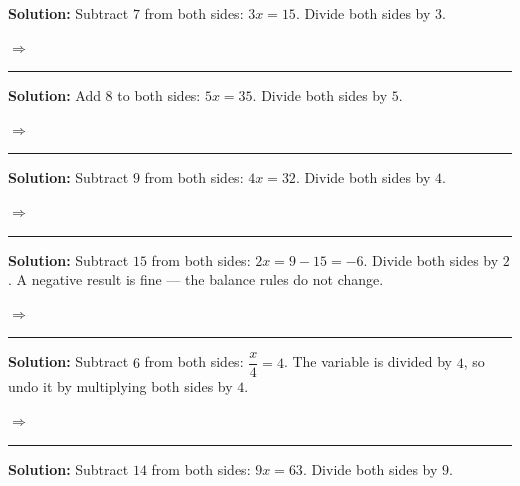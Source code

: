 \documentclass[12pt]{article}
\begin{document}




\textbf{Solution:} Subtract $7$ from both sides: $3x = 15$. Divide both sides by $3$.

$\Rightarrow$ 

\vspace{0.15cm}\noindent\rule{\linewidth}{0.2pt}


\textbf{Solution:} Add $8$ to both sides: $5x = 35$. Divide both sides by $5$.

$\Rightarrow$ 

\vspace{0.15cm}\noindent\rule{\linewidth}{0.2pt}


\textbf{Solution:} Subtract $9$ from both sides: $4x = 32$. Divide both sides by $4$.

$\Rightarrow$ 

\vspace{0.15cm}\noindent\rule{\linewidth}{0.2pt}


\textbf{Solution:} Subtract $15$ from both sides: $2x = 9 - 15 = -6$. Divide both sides by $2$. A negative result is fine --- the balance rules do not change.

$\Rightarrow$ 

\vspace{0.15cm}\noindent\rule{\linewidth}{0.2pt}


\textbf{Solution:} Subtract $6$ from both sides: $\dfrac{x}{4} = 4$. The variable is divided by $4$, so undo it by multiplying both sides by $4$.

$\Rightarrow$ 

\vspace{0.15cm}\noindent\rule{\linewidth}{0.2pt}


\textbf{Solution:} Subtract $14$ from both sides: $9x = 63$. Divide both sides by $9$.
\end{document}
